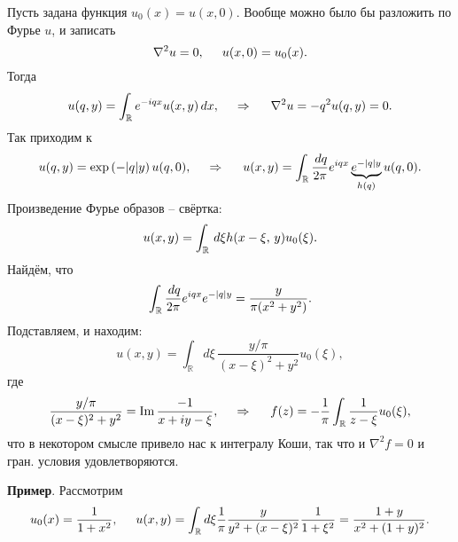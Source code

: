 Пусть задана функция $u_0 (x) = u(x, 0)$. Вообще можно было бы разложить по Фурье $u$, и записать
\begin{equation*}
    \nabla^2  u = 0,
    \hspace{5 mm}   
    u(x, 0) = u_0 (x).
\end{equation*}
Тогда
\begin{equation*}
    u(q, y)  = \int_{\mathbb{R}} e^{- i q x} u(x, y) \d x,
    \hspace{0.5cm} \Rightarrow \hspace{0.5cm}
    \nabla^2 u = - q^2 u(q, y) = 0.
\end{equation*}
Так приходим к
\begin{equation*}
    u(q, y) = \exp\left(- |q| y\right) u(q, 0),
    \hspace{0.5cm} \Rightarrow \hspace{0.5cm}   
    u(x, y) = \int_{\mathbb{R}} \frac{\d q}{2\pi} e^{i q x} \underbrace{e^{- |q| y}}_{h(q)} u(q, 0).
\end{equation*}
Произведение Фурье образов -- свёртка:
\begin{equation*}
    u(x, y) = \int_{\mathbb{R}} \d \xi h(x - \xi,\,  y) u_0 (\xi).
\end{equation*}
Найдём, что
\begin{equation*}
    \int_{\mathbb{R}} \frac{\d q}{2 \pi} e^{i q x} e^{-|q| y} = \frac{y}{\pi (x^2 + y^2)}.
\end{equation*}
Подставляем, и находим:
\begin{equation*}
    u(x, y) = \int_{\mathbb{R}} d \xi \, \frac{y/\pi}{(x-\xi)^2 + y^2} u_0 (\xi),
\end{equation*}
где 
\begin{equation*}
    \frac{y/\pi}{(x-\xi)^2 + y^2} = \Im \frac{-1}{x + i y - \xi},
    \hspace{0.5cm} \Rightarrow \hspace{0.5cm}   
    f(z) = - \frac{1}{\pi} \int_{\mathbb{R}} \frac{1}{z-\xi} u_0 (\xi),
\end{equation*}
что в некотором смысле привело нас к интегралу Коши, так что и $\nabla^2 f = 0$ и гран. условия удовлетворяются. 



\textbf{Пример}. Рассмотрим
\begin{equation*}
    u_0 (x) = \frac{1}{1 + x^2},
    \hspace{5 mm} 
    u(x, y) = \int_{\mathbb{R}} d \xi \frac{1}{\pi} \frac{y}{y^2 + (x-\xi)^2} \frac{1}{1+\xi^2} = \frac{1 + y}{x^2 + (1+y)^2}.
\end{equation*}